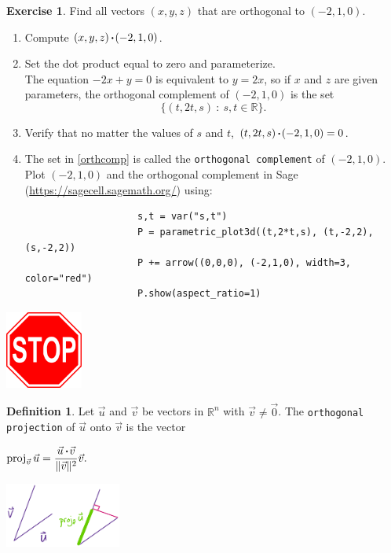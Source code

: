\documentclass{beamer}
\newcommand{\R}{\mathbb{R}}
\newcommand{\ds}{\displaystyle}
\newcommand{\fn}{\insertframenumber}
\newcommand{\proj}{\operatorname{proj}}
\newcommand{\dotp}{\,{\boldsymbol{\cdot}\hspace*{.01in}}}
\theoremstyle{definition}
\newtheorem{exercise}{Exercise}
\newtheorem*{defn}{Definition}
\renewcommand{\emph}[1]{{\color{blue}\texttt{#1}}}
\begin{document}
\begin{frame}[fragile]
	\frametitle{\fn}
	\begin{exercise}
		Find all vectors $(x,y,z)$ that are orthogonal to $(-2,1,0)$.
		\begin{enumerate}[label=(\alph*)]
			\item Compute $(x,y,z)\dotp (-2,1,0)$.
			\item Set the dot product equal to zero and parameterize.\pause\\
				The equation $-2x+y=0$ is equivalent to $y=2x$, so if $x$ and $z$ are given parameters, the orthogonal complement of $(-2,1,0)$ is the set \begin{equation}\label{orthcomp}
					\{(t,2t,s)\ :\ s,t\in\R\}.
				\end{equation}
			\item Verify that no matter the values of $s$ and $t$, $(t,2t,s)\dotp(-2,1,0)=0$.\pause
			\item The set in \eqref{orthcomp} is called the \emph{orthogonal complement} of $(-2,1,0)$.  Plot $(-2,1,0)$ and the orthogonal complement in Sage (\url{https://sagecell.sagemath.org/}) using:
			{\tiny
				\begin{verbatim}
					s,t = var("s,t")
					P = parametric_plot3d((t,2*t,s), (t,-2,2),(s,-2,2))
					P += arrow((0,0,0), (-2,1,0), width=3, color="red")
					P.show(aspect_ratio=1)
					\end{verbatim}
			}
		\end{enumerate}
	\end{exercise}
\end{frame}
\begin{frame}{\fn}
	\begin{center}
		\includegraphics[width=1in]{images/stop}
	\end{center}
	\begin{defn}
		Let $\vec u$ and $\vec v$ be vectors in $\R^n$ with $\vec v\neq \vec 0$. The \emph{orthogonal projection} of $\vec u$ onto $\vec v$ is  the vector	
	\end{defn}
	\begin{center}
		\begin{minipage}{1.5in}
			$\ds\proj_{\vec v} \vec u=\frac{\vec u\dotp\vec v}{\|\vec v\|^2}\vec v.$
		\end{minipage}\begin{minipage}{1.5in}
		\includegraphics[width=1.5in]{images/orth_proj}
	\end{minipage}
	\end{center}
\end{frame}
\end{document}
